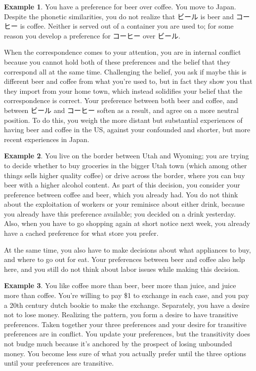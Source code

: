 \documentclass{article}
\theoremstyle{plain}
\theoremstyle{definition}
\newtheorem{example}{Example}[section]
\theoremstyle{remark}
\begin{document}
	\begin{example}
		You have a preference for beer over coffee. You move to Japan. Despite the phonetic similarities, you do not realize that ビール is beer and コーヒー is coffee. Neither is served out of a container you are used to; for some reason you develop a preference for コーヒー over ビール. 
		
		When the correspondence comes to your attention, you are in internal conflict because you cannot hold both of these preferences and the belief that they correspond all at the same time. Challenging the belief, you ask if maybe this is different beer and coffee from what you're used to, but in fact they show you that they import from your home town, which instead solidifies your belief that the correspondence is correct. Your preference between both beer and coffee, and between ビール and コーヒー soften as a result, and agree on a more neutral position. To do this, you weigh the more distant but substantial experiences of having beer and coffee in the US, against your confounded and shorter, but more recent experiences in Japan.
	\end{example}

	\begin{example}
		You live on the border between Utah and Wyoming; you are trying to decide whether to buy groceries in the bigger Utah town (which among other things sells higher quality coffee) or drive across the border, where you can buy beer with a higher alcohol content. As part of this decision, you consider your preference between coffee and beer, which you already had. You do not think about the exploitation of workers or your reminisce about either drink, because you already have this preference available; you decided on a drink yesterday. Also, when you have to go shopping again at short notice next week, you already have a cached preference for what store you prefer. 
		
		At the same time, you also have to make decisions about what appliances to buy, and where to go out for eat. Your preferences between beer and coffee also help here, and you still do not think about labor issues while making this decision.
	\end{example}

	\begin{example}
		You like coffee more than beer, beer more than juice, and juice more than coffee. You're willing to pay \$1 to exchange in each case, and you pay a 20th century dutch bookie to make the exchange. Separately, you have a desire not to lose money. Realizing the pattern, you form a desire to have transitive preferences. Taken together your three preferences and your desire for transitive preferences are in conflict. You update your preferences, but the transitivity does not budge much because it's anchored by the prospect of losing unbounded money. You become less sure of what you actually prefer until the three options until your preferences are transitive.
	\end{example}
\end{document}
